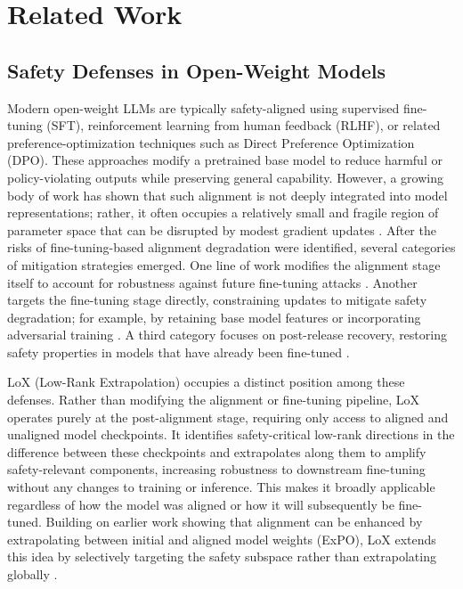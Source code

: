\documentclass[letterpaper,twocolumn,10pt]{article}
\begin{document}
\section{Related Work}

\subsection{Safety Defenses in Open-Weight Models}

Modern open-weight LLMs are typically safety-aligned using supervised fine-tuning (SFT), reinforcement learning from human feedback (RLHF), or related preference-optimization techniques such as Direct Preference Optimization (DPO). These approaches modify a pretrained base model to reduce harmful or policy-violating outputs while preserving general capability. However, a growing body of work has shown that such alignment is not deeply integrated into model representations; rather, it often occupies a relatively small and fragile region of parameter space that can be disrupted by modest gradient updates \cite{li2025salorasafetyalignmentpreservedlowrank}.
After the risks of fine-tuning-based alignment degradation were identified, several categories of mitigation strategies emerged. One line of work modifies the alignment stage itself to account for robustness against future fine-tuning attacks \cite{rosati2024representationnoisingdefencemechanism}. Another targets the fine-tuning stage directly, constraining updates to mitigate safety degradation; for example, by retaining base model features or incorporating adversarial training \cite{wang2024mitigatingfinetuningbasedjailbreak}. A third category focuses on post-release recovery, restoring safety properties in models that have already been fine-tuned \cite{dong2021pretrainedlanguagemodelsfinetuned}.

LoX (Low-Rank Extrapolation) occupies a distinct position among these defenses. Rather than modifying the alignment or fine-tuning pipeline, LoX operates purely at the post-alignment stage, requiring only access to aligned and unaligned model checkpoints. It identifies safety-critical low-rank directions in the difference between these checkpoints and extrapolates along them to amplify safety-relevant components, increasing robustness to downstream fine-tuning without any changes to training or inference. This makes it broadly applicable regardless of how the model was aligned or how it will subsequently be fine-tuned. Building on earlier work showing that alignment can be enhanced by extrapolating between initial and aligned model weights (ExPO), LoX extends this idea by selectively targeting the safety subspace rather than extrapolating globally \cite{zheng2025modelextrapolationexpeditesalignment}.
\end{document}
